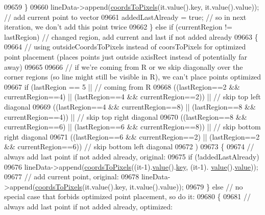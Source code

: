\begin{DoxyCode}
09659       \}
09660       lineData->append(\hyperlink{a00024_ade710a776104b14c1c835168ce1bfc5c}{coordsToPixels}(it.value().key, it.value().value)); \textcolor{comment}{// add current
       point to vector}
09661       addedLastAlready = \textcolor{keyword}{true}; \textcolor{comment}{// so in next iteration, we don't add this point twice}
09662     \} \textcolor{keywordflow}{else} \textcolor{keywordflow}{if} (currentRegion != lastRegion) \textcolor{comment}{// changed region, add current and last if not added already}
09663     \{
09664       \textcolor{comment}{// using outsideCoordsToPixels instead of coorsToPixels for optimized point placement (places points
       just outside axisRect instead of potentially far away)}
09665       
09666       \textcolor{comment}{// if we're coming from R or we skip diagonally over the corner regions (so line might still be
       visible in R), we can't place points optimized}
09667       \textcolor{keywordflow}{if} (lastRegion == 5 || \textcolor{comment}{// coming from R}
09668           ((lastRegion==2 && currentRegion==4) || (lastRegion==4 && currentRegion==2)) || \textcolor{comment}{// skip top left
       diagonal}
09669           ((lastRegion==4 && currentRegion==8) || (lastRegion==8 && currentRegion==4)) || \textcolor{comment}{// skip top right
       diagonal}
09670           ((lastRegion==8 && currentRegion==6) || (lastRegion==6 && currentRegion==8)) || \textcolor{comment}{// skip bottom
       right diagonal}
09671           ((lastRegion==6 && currentRegion==2) || (lastRegion==2 && currentRegion==6))    \textcolor{comment}{// skip bottom
       left diagonal}
09672           )
09673       \{
09674         \textcolor{comment}{// always add last point if not added already, original:}
09675         \textcolor{keywordflow}{if} (!addedLastAlready)
09676           lineData->append(\hyperlink{a00024_ade710a776104b14c1c835168ce1bfc5c}{coordsToPixels}((it-1).\hyperlink{a00116_aee90379adb0307effb138f4871edbc5c}{value}().\hyperlink{a00116_a94bb892c30911cd62cba0707a5395be4}{key}, (it-1).
      \hyperlink{a00116_aee90379adb0307effb138f4871edbc5c}{value}().\hyperlink{a00116_aee90379adb0307effb138f4871edbc5c}{value}));
09677         \textcolor{comment}{// add current point, original:}
09678         lineData->append(\hyperlink{a00024_ade710a776104b14c1c835168ce1bfc5c}{coordsToPixels}(it.value().key, it.value().value));
09679       \} \textcolor{keywordflow}{else} \textcolor{comment}{// no special case that forbids optimized point placement, so do it:}
09680       \{
09681         \textcolor{comment}{// always add last point if not added already, optimized:}

\end{DoxyCode}
